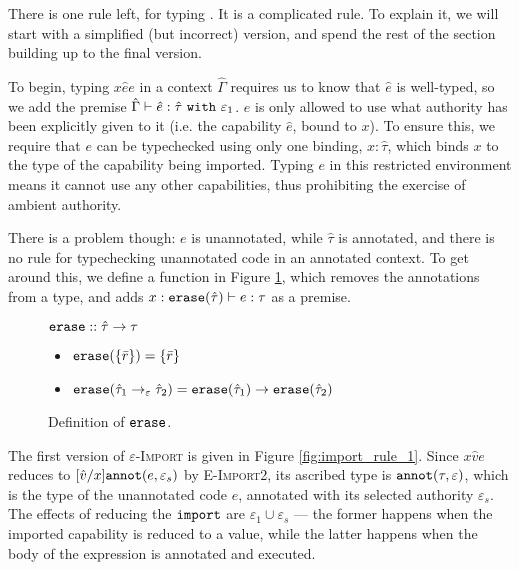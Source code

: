 There is one rule left, for typing . It is a complicated rule. To
explain it, we will start with a simplified (but incorrect) version, and spend the
rest of the section building up to the final version.


To begin, typing ${x}{\hat e}{e}$ in a context
$\hat \Gamma$ requires us to know that $\hat e$ is
well-typed, so we add the premise
$\hat \Gamma \vdash \hat e: \hat \tau~\mathtt{with}~ \varepsilon_1$.
$e$ is only allowed to use what authority has been explicitly given to it
(i.e. the capability $\hat e$, bound to $x$). To ensure this, we require
that $e$ can be typechecked using only one binding, $x: \hat \tau$,
which binds $x$ to the type of the capability being imported.
Typing $e$ in this restricted environment means it cannot use any
other capabilities, thus prohibiting the exercise of ambient authority.

There is a problem though: $e$ is unannotated, while $\hat \tau$ is
annotated, and there is no rule for typechecking unannotated code in
an annotated context. To get around this, we define a function
 in Figure \ref{fig:erase_defn}, which removes the
annotations from a type, and adds
$x: \mathtt{erase}(\hat \tau) \vdash e: \tau$ as a premise.


\begin{figure}
\vspace{-0.2cm}
$\mathtt{erase} :: \hat \tau \rightarrow \tau$
\begin{itemize}
	\setlength\itemsep{-0.2em}
	\item[] $\mathtt{erase}(\{ \bar r \}) = \{ \bar r \}$
	\item[] $\mathtt{erase}(\hat \tau_1 \rightarrow_{\varepsilon} \hat \tau_2) = \mathtt{erase}(\hat \tau_1) \rightarrow \mathtt{erase}(\hat \tau_2)$
\end{itemize}


\vspace{-0.5cm}
\caption{Definition of $\mathtt{erase}$.}
\vspace{-0.5cm}
\label{fig:erase_defn}
\end{figure}

The first version of \textsc{$\varepsilon$-Import} is given in Figure
\ref{fig:import_rule_1}. Since
${x}{\hat v}{e}$ reduces to $[\hat
v/x]\mathtt{annot}(e, \varepsilon_s)$ by \textsc{E-Import2}, its ascribed type is $\mathtt{annot}(\tau, \varepsilon)$, which is the type of the unannotated
code $e$, annotated with its selected authority $\varepsilon_s$. The
effects of reducing the $\mathtt{import}$ are $\varepsilon_1 \cup \varepsilon_s$
--- the former happens when the imported capability is reduced to a value,
while the latter happens when the body of the  expression is
annotated and executed.


